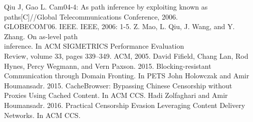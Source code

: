 \documentclass[conference]{IEEEtran}
\begin{document}
\begin{thebibliography}{00}
 Qiu J, Gao L. Cam04-4: As path inference by exploiting known as paths[C]//Global Telecommunications Conference, 2006.\\ GLOBECOM'06. IEEE. IEEE, 2006: 1-5.
 Z. Mao, L. Qiu, J. Wang, and Y. Zhang. On as-level path\\
inference. In ACM SIGMETRICS Performance Evaluation\\
Review, volume 33, pages 339–349. ACM, 2005.
 David Fifield, Chang Lan, Rod Hynes, Percy Wegmann, and Vern Paxson. 2015. Blocking-resistant Communication through Domain Fronting. In PETS
 John Holowczak and Amir Houmansadr. 2015. CacheBrowser: Bypassing Chinese Censorship without Proxies Using Cached Content. In ACM CCS.
 Hadi Zolfaghari and Amir Houmansadr. 2016. Practical Censorship Evasion Leveraging Content Delivery Networks. In ACM CCS.
\end{thebibliography}
\end{document}
